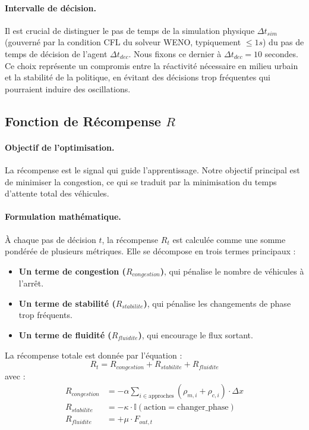 \paragraph{Intervalle de décision.} Il est crucial de distinguer le pas de temps de la simulation physique $\Delta t_{sim}$ (gouverné par la condition CFL du solveur WENO, typiquement $\leq 1s$) du pas de temps de décision de l'agent $\Delta t_{dec}$. Nous fixons ce dernier à $\Delta t_{dec}=10$ secondes. Ce choix représente un compromis entre la réactivité nécessaire en milieu urbain et la stabilité de la politique, en évitant des décisions trop fréquentes qui pourraient induire des oscillations.

\subsection{Fonction de Récompense $R$}
\label{subsec:fonction_recompense}

\paragraph{Objectif de l'optimisation.} La récompense est le signal qui guide l'apprentissage. Notre objectif principal est de minimiser la congestion, ce qui se traduit par la minimisation du temps d'attente total des véhicules.

\paragraph{Formulation mathématique.} À chaque pas de décision $t$, la récompense $R_t$ est calculée comme une somme pondérée de plusieurs métriques.
Elle se décompose en trois termes principaux :
\begin{itemize}
    \item \textbf{Un terme de congestion ($R_{congestion}$)}, qui pénalise le nombre de véhicules à l'arrêt.
    \item \textbf{Un terme de stabilité ($R_{stabilite}$)}, qui pénalise les changements de phase trop fréquents.
    \item \textbf{Un terme de fluidité ($R_{fluidite}$)}, qui encourage le flux sortant.
\end{itemize}
La récompense totale est donnée par l'équation :
\begin{equation}
R_t = R_{congestion} + R_{stabilite} + R_{fluidite}
\end{equation}
avec :
\begin{align}
R_{congestion} &= - \alpha \sum_{i \in \text{approches}} (\rho_{m,i} + \rho_{c,i}) \cdot \Delta x \\
R_{stabilite} &= - \kappa \cdot \mathbb{I}(\text{action} = \text{changer\_phase}) \\
R_{fluidite} &= + \mu \cdot F_{out, t}
\end{align}

